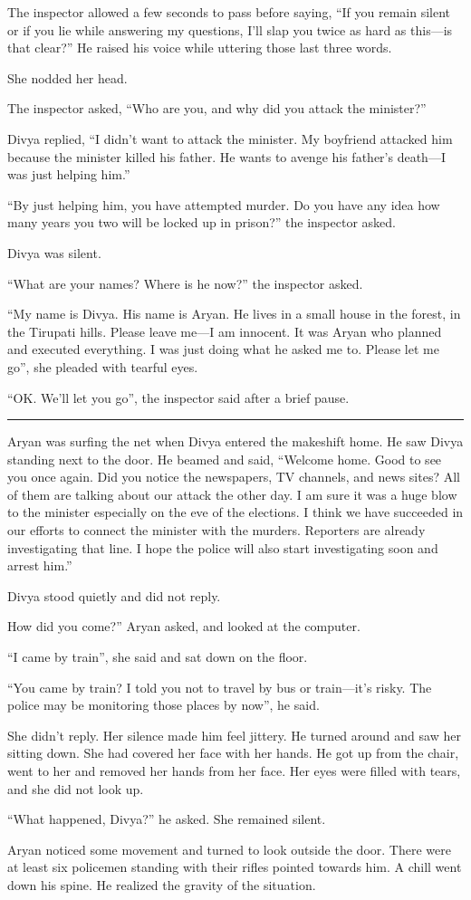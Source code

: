 The inspector allowed a few seconds to pass before saying, “If you remain
silent or if you lie while answering my questions, I'll slap you twice as hard
as this—is that clear?” He raised his voice while uttering those last three
words.

She nodded her head.

The inspector asked, “Who are you, and why did you attack the minister?”

Divya replied, “I didn't want to attack the minister. My boyfriend attacked him
because the minister killed his father. He wants to avenge his father's death—I
was just helping him.”

“By just helping him, you have attempted murder. Do you have any idea how many
years you two will be locked up in prison?” the inspector asked.

Divya was silent.

“What are your names? Where is he now?” the inspector asked.

“My name is Divya. His name is Aryan. He lives in a small house in the forest, in
the Tirupati hills. Please leave me—I am innocent. It was Aryan who planned
and executed everything. I was just doing what he asked me to. Please let me
go”, she pleaded with tearful eyes.

“OK. We'll let you go”, the inspector said after a brief pause.

\fancybreak{* * *}

Aryan was surfing the net when Divya entered the makeshift home. He saw Divya
standing next to the door. He beamed and said, “Welcome home. Good to see you
once again. Did you notice the newspapers, TV channels, and news sites? All of
them are talking about our attack the other day. I am sure it was a huge blow
to the minister especially on the eve of the elections. I think we have succeeded in our
efforts to connect the minister with the murders. Reporters are already
investigating that line. I hope the police will also start investigating soon
and arrest him.”

Divya stood quietly and did not reply.

How did you come?” Aryan asked, and looked at the computer.

“I came by train”, she said and sat down on the floor.

“You came by train? I told you not to travel by bus or train—it's risky. The
police may be monitoring those places by now”, he said.

She didn't reply. Her silence made him feel jittery. He turned around and saw
her sitting down. She had covered her face with her hands. He got up from the
chair, went to her and removed her hands from her face. Her eyes were filled
with tears, and she did not look up.

“What happened, Divya?” he asked. She remained silent.

Aryan noticed some movement and turned to look outside the door. There were
at least six policemen standing with their rifles pointed towards him. A chill
went down his spine. He realized the gravity of the situation.
